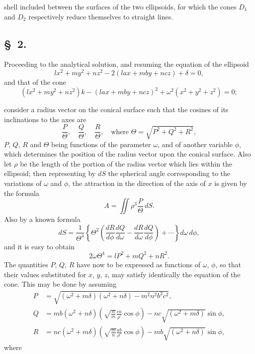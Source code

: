 \documentclass[11pt,a4paper]{article}
\theoremstyle{definition}
\begin{document}
shell included between the surfaces of the two ellipsoids, for which the cones $D_{1}$ and $D_{2}$ respectively reduce themselves to straight lines.

\subsection*{\S~2.}

Proceeding to the analytical solution, and resuming the equation of the ellipsoid
\[
lx^{2} + my^{2} + nz^{2} - 2(lax + mby + ncz) + \delta = 0,
\]
and that of the cone
\[
(lx^{2} + my^{2} + nz^{2})k - (lax + mby + ncz)^{2} + \omega^{2}(x^{2} + y^{2} + z^{2}) = 0;
\]

\newpage

\setcounter{page}{435}

consider a radius vector on the conical surface such that the cosines of its inclinations to the axes are
\[
\frac{P}{\Theta}, \quad \frac{Q}{\Theta}, \quad \frac{R}{\Theta}, \quad \text{where } \Theta = \sqrt{P^{2} + Q^{2} + R^{2}},
\]
$P$, $Q$, $R$ and $\Theta$ being functions of the parameter $\omega$, and of another variable $\phi$, which determines the position of the radius vector upon the conical surface. Also let $\rho$ be the length of the portion of the radius vector which lies within the ellipsoid; then representing by $dS$ the spherical angle corresponding to the variations of $\omega$ and $\phi$, the attraction in the direction of the axis of $x$ is given by the formula
\[
A = \iint \rho^{3} \frac{P}{\Theta}\, dS.
\]
Also by a known formula
\[
dS = \frac{1}{\Theta^{4}} \left\{ \Theta^{2}\left(\frac{dR}{d\phi}\frac{dQ}{d\omega} - \frac{dR}{d\omega}\frac{dQ}{d\phi}\right) + \cdots \right\} d\omega\, d\phi,
\]
and it is easy to obtain
\[
2\omega\Theta^{4} = lP^{2} + mQ^{2} + nR^{2}.
\]
The quantities $P$, $Q$, $R$ have now to be expressed as functions of $\omega$, $\phi$, so that their values substituted for $x$, $y$, $z$, may satisfy identically the equation of the cone. This may be done by assuming
\begin{align*}
P &= \sqrt{(\omega^{2} + m\delta)(\omega^{2} + n\delta) - m^{2}n^{2}b^{2}c^{2}}, \\
Q &= mb(\omega^{2} + n\delta)\left(\sqrt{\frac{n}{m}}\frac{ca}{\rho'}\cos\phi\right) - nc\sqrt{(\omega^{2} + m\delta)}\sin\phi, \\
R &= nc(\omega^{2} + m\delta)\left(\sqrt{\frac{m}{n}}\frac{ab}{\rho'}\cos\phi\right) - mb\sqrt{(\omega^{2} + n\delta)}\sin\phi,
\end{align*}
where
\end{document}
